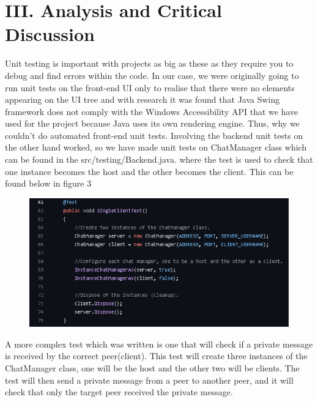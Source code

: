 \documentclass{COMPXXXX}
\begin{document}
\section{III. Analysis and Critical Discussion}
\normalsize \textrm {Unit testing is important with projects as big as these as they require you to debug and find errors within the code. In our case, we were originally going to run unit tests on the front-end UI only to realise that there were no elements appearing on the UI tree and with research it was found that Java  Swing framework does not comply with the Windows Accessibility API that we have used for the project because Java uses its own rendering engine. Thus, why we couldn’t do automated front-end unit tests. Involving the backend unit tests on the other hand worked, so we have made unit tests on ChatManager class which can be found in the src/testing/Backend.java. where the test is used to check that one instance becomes the host and the other becomes the client. This can be found below in figure 3}\\
\begin{figure}
\centering
\includegraphics[width=1.0\linewidth]{Unit Test on ChatManager.png}
\caption{}
\label{fig:figure03}
\end{figure}

\normalsize \textrm {A more complex test which was written is one that will check if a private message is received by the correct peer(client). This test will create three instances of the ChatManager class, one will be the host and the other two will be clients. The test will then send a private message from a peer to another peer, and it will check that only the target peer received the private message.}
\end{document}
